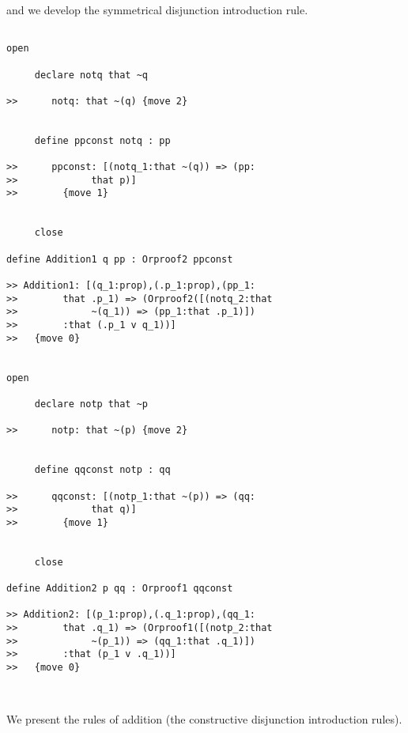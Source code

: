 \documentclass[12pt]{article}
\begin{document}
and we develop the symmetrical disjunction introduction rule.

\begin{verbatim}

open

     declare notq that ~q

>>      notq: that ~(q) {move 2}


     define ppconst notq : pp

>>      ppconst: [(notq_1:that ~(q)) => (pp:
>>             that p)]
>>        {move 1}


     close

define Addition1 q pp : Orproof2 ppconst

>> Addition1: [(q_1:prop),(.p_1:prop),(pp_1:
>>        that .p_1) => (Orproof2([(notq_2:that 
>>             ~(q_1)) => (pp_1:that .p_1)])
>>        :that (.p_1 v q_1))]
>>   {move 0}


open

     declare notp that ~p

>>      notp: that ~(p) {move 2}


     define qqconst notp : qq

>>      qqconst: [(notp_1:that ~(p)) => (qq:
>>             that q)]
>>        {move 1}


     close

define Addition2 p qq : Orproof1 qqconst

>> Addition2: [(p_1:prop),(.q_1:prop),(qq_1:
>>        that .q_1) => (Orproof1([(notp_2:that 
>>             ~(p_1)) => (qq_1:that .q_1)])
>>        :that (p_1 v .q_1))]
>>   {move 0}



\end{verbatim}

We present the rules of addition (the constructive disjunction  introduction rules).
\end{document}
